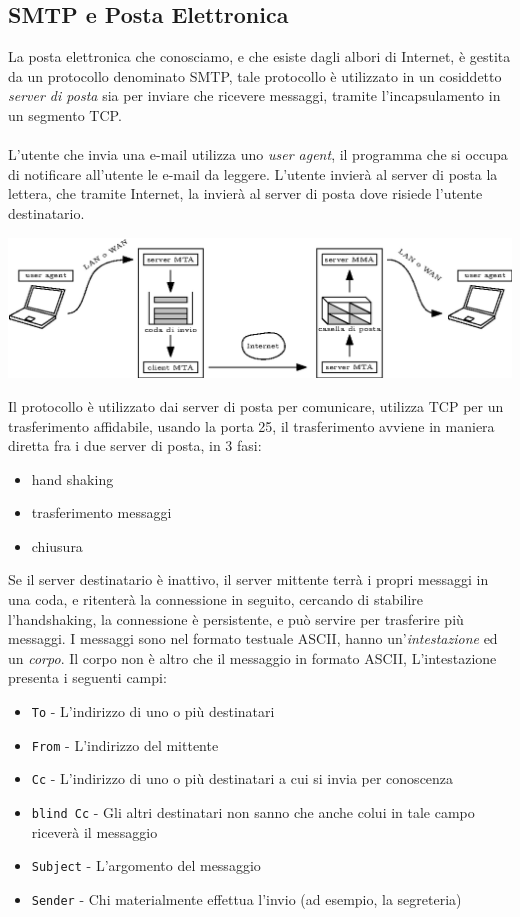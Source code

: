 \documentclass[12pt, letterpaper]{article}
\newcommand{\code}[1]{\colorbox{light-gray}{\texttt{#1}}}
\newcommand{\acc}{\\\hphantom{}\\}
\begin{document}
\subsection{SMTP e Posta Elettronica}
La posta elettronica che conosciamo, e che esiste dagli albori di 
Internet, è gestita da un protocollo denominato SMTP, tale protocollo è utilizzato in un 
cosiddetto \textit{server di posta} sia per inviare che ricevere messaggi, tramite 
l'incapsulamento in un segmento TCP.\acc 
L'utente che invia una e-mail utilizza uno \textit{user agent}, il programma che si occupa di notificare 
all'utente le e-mail da leggere. L'utente invierà al server di posta la lettera, che tramite 
Internet, la invierà al server di posta dove risiede l'utente destinatario.\begin{center}
    \includegraphics[width=1\textwidth ]{images/smtp.eps}
\end{center}
Il protocollo è utilizzato dai server di posta per comunicare, utilizza TCP per un trasferimento 
affidabile, usando la porta 25, il trasferimento avviene in maniera diretta fra i due server di posta, in 
3 fasi:\begin{itemize}
    \item hand shaking 
    \item trasferimento messaggi 
    \item chiusura
\end{itemize}
Se il server destinatario è inattivo, il server mittente terrà i propri messaggi in una coda, e ritenterà 
la connessione in seguito, cercando di stabilire l'handshaking, la connessione è persistente, e può servire 
per trasferire più messaggi. I messaggi sono nel formato testuale ASCII, hanno un'\textit{intestazione}
ed un \textit{corpo}. Il corpo non è altro che il messaggio in formato 
ASCII, L'intestazione presenta i seguenti campi:\begin{itemize}
    \item \code{To} - L'indirizzo di uno o più destinatari 
    \item \code{From} - L'indirizzo del mittente 
    \item \code{Cc} - L'indirizzo di uno o più destinatari a cui si invia per conoscenza 
    \item \code{blind Cc} - Gli altri destinatari non sanno che anche colui in tale campo riceverà il messaggio 
    \item \code{Subject} - L'argomento del messaggio 
    \item \code{Sender} - Chi materialmente effettua l'invio (ad esempio, la segreteria)
\end{itemize}
\end{document}
